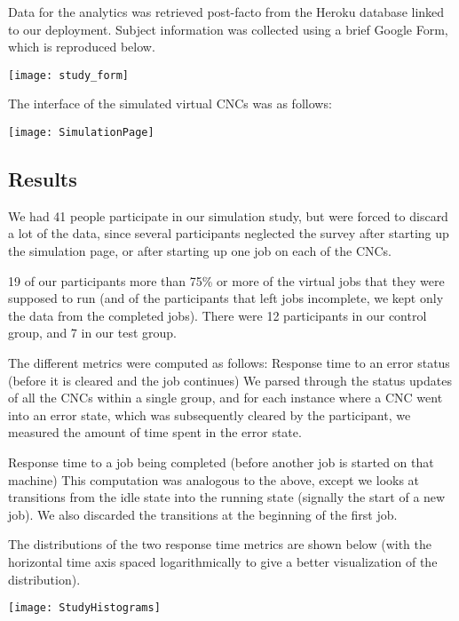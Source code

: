 \documentclass[12pt,letterpaper,titlepage]{article}
\begin{document}
Data for the analytics was retrieved post-facto from the Heroku database linked to our deployment. Subject information was collected using a brief Google Form, which is reproduced below. 

\begin{center}
	\texttt{[image: study\_form]}
\end{center}

The interface of the simulated virtual CNCs was as follows:
\begin{center}
	\texttt{[image: SimulationPage]}
\end{center}

\subsection{Results}

We had 41 people participate in our simulation study, but were forced to discard a lot of the data, since several participants neglected the survey after starting up the simulation page, or after starting up one job on each of the CNCs.

19 of our participants more than 75\% or more of the virtual jobs that they were supposed to run (and of the participants that left jobs incomplete, we kept only the data from the completed jobs).
There were 12 participants in our control group, and 7 in our test group.

The different metrics were computed as follows:
Response time to an error status (before it is cleared and the job continues)
We parsed through the status updates of all the CNCs within a single group, and for each instance where a CNC went into an error state, which was subsequently cleared by the participant, we measured the amount of time spent in the error state.

Response time to a job being completed (before another job is started on that machine)
This computation was analogous to the above, except we looks at transitions from the idle state into the running state (signally the start of a new job). We also discarded the transitions at the beginning of the first job.

The distributions of the two response time metrics are shown below (with the horizontal time axis spaced logarithmically to give a better visualization of the distribution).

\begin{center}
	\texttt{[image: StudyHistograms]}
\end{center}
\end{document}
